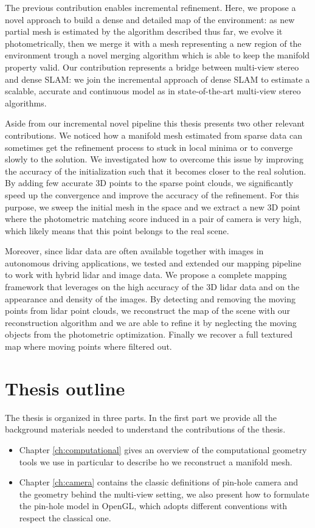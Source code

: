 The previous contribution enables incremental refinement. Here, we propose a novel approach to build a dense and detailed map of the environment: as new partial mesh is estimated by the algorithm described thus far, we evolve it photometrically, then we merge it with a mesh representing a new region of the environment trough a novel merging algorithm which is able to keep the manifold property valid.
Our contribution represents a bridge between multi-view stereo and 
dense SLAM: we join the incremental approach of dense SLAM to estimate a  scalable, accurate and continuous model as in state-of-the-art multi-view stereo algorithms. 

Aside from our incremental novel pipeline this thesis presents two other relevant contributions.
We noticed how a manifold mesh estimated from sparse data can sometimes get the refinement process to stuck  in local minima or to converge slowly to the solution. 
We investigated how to overcome this issue by improving the accuracy of  the initialization such that it becomes closer to the real solution.
By adding few accurate 3D points to the sparse point clouds, we significantly speed up the convergence and improve the accuracy of the refinement.
For this purpose, we sweep the initial mesh in the space and we extract a new 3D point where the photometric matching score induced in a pair of camera is very high, which likely means that this point belongs to the real scene.

Moreover, since lidar data are often available together with images in autonomous driving applications, we tested and extended our mapping pipeline to work with hybrid lidar and image data.
We propose a complete mapping framework  that leverages on the high accuracy of the 3D lidar data and on the appearance and density of the images.
By detecting and removing the moving points from lidar point clouds, we reconstruct the map of the scene with our reconstruction algorithm and we are able to refine it by neglecting the moving objects from the photometric optimization. Finally we recover a full textured map where moving points where filtered out.



\section{Thesis outline}

The thesis is organized in three parts. 
In the first part we provide all the background materials needed to understand the contributions of the thesis.
\begin{itemize}
 \item Chapter \ref{ch:computational} gives an overview of the computational geometry tools we use in particular to describe ho we reconstruct a manifold mesh.
 \item Chapter \ref{ch:camera} contains the classic definitions of pin-hole camera and the geometry behind the  multi-view setting, we also present how to formulate the pin-hole model in OpenGL, which adopts different conventions with respect the classical one.
\end{itemize}

